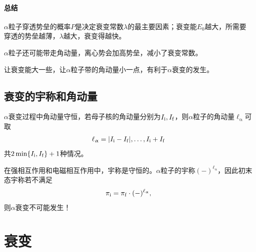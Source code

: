 \paragraph{总结}
\begin{compactenum}
	\item $\alpha$粒子穿透势垒的概率$P$是决定衰变常数$\lambda$的最主要因素；衰变能$E_0$越大，所需要穿透的势垒越薄，$\lambda$越大，衰变得越快。
	\item $\alpha$粒子还可能带走角动量，离心势会加高势垒，减小了衰变常数。
\end{compactenum}
让衰变能大一些，让$\alpha$粒子带的角动量小一点，有利于$\alpha$衰变的发生。

\subsection{\alpharay 衰变的宇称和角动量}

$\alpha$衰变过程中角动量守恒，若母子核的角动量分别为$I_\mathrm i,I_\mathrm f$，则$\alpha$粒子的角动量$\ell_\upalpha$可取
\begin{align}
	\ell_\upalpha = \lvert I_\mathrm i - I_\mathrm f\rvert,\ldots,I_\mathrm i + I_\mathrm f
\end{align}
共$2\min\{I_\mathrm i,I_\mathrm f\} + 1$种情况。

在强相互作用和电磁相互作用中，宇称是守恒的。$\alpha$粒子的宇称$(-)^{\ell_\upalpha}$，因此初末态宇称若不满足
\begin{align}
	\pi_\mathrm i = \pi_\mathrm f \cdot (-)^{\ell_\upalpha},
\end{align}
则$\alpha$衰变不可能发生！

\section{\betaray 衰变}

